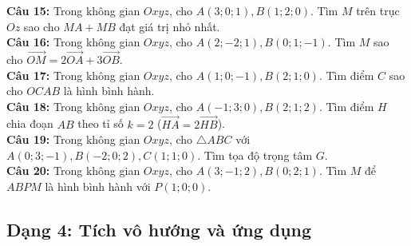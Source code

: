 \documentclass[12pt]{article}
\begin{document}
\begin{btdo}
		\noindent \textbf{Câu 15:} Trong không gian $Oxyz$, cho $A(3; 0; 1), B(1; 2; 0)$. Tìm $M$ trên trục $Oz$ sao cho $MA + MB$ đạt giá trị nhỏ nhất. \\
		\noindent \textbf{Câu 16:} Trong không gian $Oxyz$, cho $A(2; -2; 1), B(0; 1; -1)$. Tìm $M$ sao cho $\vec{OM} = 2\vec{OA} + 3\vec{OB}$. \\
		\noindent \textbf{Câu 17:} Trong không gian $Oxyz$, cho $A(1; 0; -1), B(2; 1; 0)$. Tìm điểm $C$ sao cho $OCAB$ là hình bình hành. \\
		\noindent \textbf{Câu 18:} Trong không gian $Oxyz$, cho $A(-1; 3; 0), B(2; 1; 2)$. Tìm điểm $H$ chia đoạn $AB$ theo tỉ số $k=2$ ($\vec{HA} = 2\vec{HB}$). \\
		\noindent \textbf{Câu 19:} Trong không gian $Oxyz$, cho $\triangle ABC$ với $A(0; 3; -1), B(-2; 0; 2), C(1; 1; 0)$. Tìm tọa độ trọng tâm $G$. \\
		\noindent \textbf{Câu 20:} Trong không gian $Oxyz$, cho $A(3; -1; 2), B(0; 2; 1)$. Tìm $M$ để $ABPM$ là hình bình hành với $P(1; 0; 0)$.
	\end{btdo}
	\subsection{Dạng 4: Tích vô hướng và ứng dụng}
	
\end{document}
